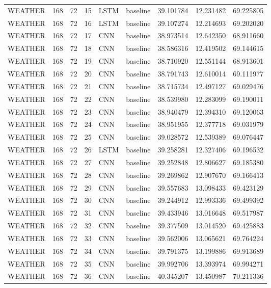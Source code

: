 \begin{table}
\begin{tabular}{lrrrllrrr}
WEATHER & 168 & 72 & 15 & LSTM & baseline & 39.101784 & 12.231482 & 69.225805 \\
WEATHER & 168 & 72 & 16 & LSTM & baseline & 39.107274 & 12.214693 & 69.202020 \\
WEATHER & 168 & 72 & 17 & CNN & baseline & 38.973514 & 12.642350 & 68.911660 \\
WEATHER & 168 & 72 & 18 & CNN & baseline & 38.586316 & 12.419502 & 69.144615 \\
WEATHER & 168 & 72 & 19 & CNN & baseline & 38.710920 & 12.551144 & 68.913601 \\
WEATHER & 168 & 72 & 20 & CNN & baseline & 38.791743 & 12.610014 & 69.111977 \\
WEATHER & 168 & 72 & 21 & CNN & baseline & 38.715734 & 12.497127 & 69.029476 \\
WEATHER & 168 & 72 & 22 & CNN & baseline & 38.539980 & 12.283099 & 69.190011 \\
WEATHER & 168 & 72 & 23 & CNN & baseline & 38.940479 & 12.394310 & 69.120063 \\
WEATHER & 168 & 72 & 24 & CNN & baseline & 38.951955 & 12.377718 & 69.031979 \\
WEATHER & 168 & 72 & 25 & CNN & baseline & 39.028572 & 12.539389 & 69.076447 \\
WEATHER & 168 & 72 & 26 & LSTM & baseline & 39.258281 & 12.327406 & 69.196532 \\
WEATHER & 168 & 72 & 27 & CNN & baseline & 39.252848 & 12.806627 & 69.185380 \\
WEATHER & 168 & 72 & 28 & CNN & baseline & 39.269862 & 12.907670 & 69.166413 \\
WEATHER & 168 & 72 & 29 & CNN & baseline & 39.557683 & 13.098433 & 69.423129 \\
WEATHER & 168 & 72 & 30 & CNN & baseline & 39.244912 & 12.993336 & 69.499392 \\
WEATHER & 168 & 72 & 31 & CNN & baseline & 39.433946 & 13.016648 & 69.517987 \\
WEATHER & 168 & 72 & 32 & CNN & baseline & 39.377509 & 13.014520 & 69.425883 \\
WEATHER & 168 & 72 & 33 & CNN & baseline & 39.562006 & 13.065621 & 69.764224 \\
WEATHER & 168 & 72 & 34 & CNN & baseline & 39.791375 & 13.199886 & 69.913689 \\
WEATHER & 168 & 72 & 35 & CNN & baseline & 39.992706 & 13.393974 & 69.994271 \\
WEATHER & 168 & 72 & 36 & CNN & baseline & 40.345207 & 13.450987 & 70.211336 \\

\end{tabular}
\end{table}
